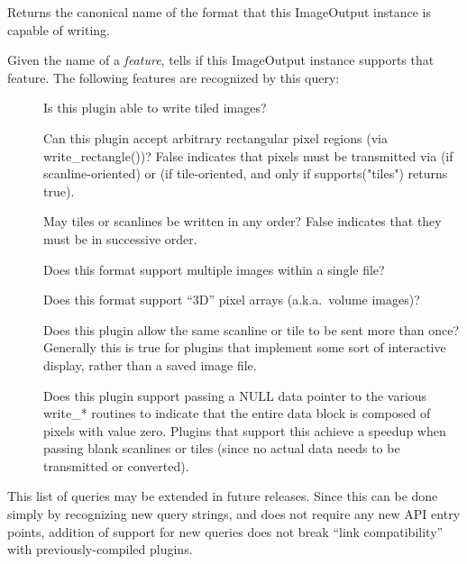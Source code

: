 \apiend

Returns the canonical name of the format that this {\kw ImageOutput}
instance is capable of writing.
\apiend

Given the name of a \emph{feature}, tells if this {\kw ImageOutput} 
instance supports that feature.  The following features are recognized
by this query:
\begin{description}
\item[\spc] \spc 
\item[\rm {}] Is this plugin able to write tiled images?
\item[\rm {}] Can this plugin accept arbitrary rectangular
  pixel regions (via {\kw write_rectangle()})?  False indicates that
  pixels must be transmitted via \writescanline (if
  scanline-oriented) or \writetile (if tile-oriented, and only if
  {\kw supports("tiles")} returns true).
\item[\rm {}] May tiles or scanlines be written in any
  order?  False indicates that they must be in successive order.
\item[\rm {}] Does this format support multiple images
  within a single file?
\item[\rm {}] Does this format support ``3D'' pixel arrays
  (a.k.a.\ volume images)?
\item[\rm {}] Does this plugin allow the same scanline or
  tile to be sent more than once?  Generally this is true for plugins
  that implement some sort of interactive display, rather than a saved
  image file.
\item[\rm {}] Does this plugin support passing a NULL data
  pointer to the various {\kw write_*} routines to indicate that the
  entire data block is composed of pixels with value zero.  Plugins
  that support this achieve a speedup when passing blank scanlines or
  tiles (since no actual data needs to be transmitted or converted).
\end{description}

\noindent This list of queries may be extended in future releases.
Since this can be done simply by recognizing new query strings, and does
not require any new API entry points, addition of support for new
queries does not break ``link compatibility'' with previously-compiled
plugins.
\apiend


